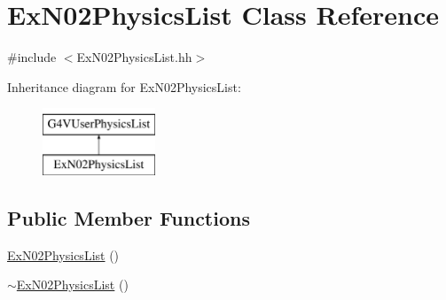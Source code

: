 \hypertarget{class_ex_n02_physics_list}{\section{Ex\-N02\-Physics\-List Class Reference}
\label{class_ex_n02_physics_list}
}


{\ttfamily \#include $<$Ex\-N02\-Physics\-List.\-hh$>$}

Inheritance diagram for Ex\-N02\-Physics\-List\-:\begin{figure}[H]
\begin{center}
\leavevmode
\includegraphics[height=2.000000cm]{class_ex_n02_physics_list}
\end{center}
\end{figure}
\subsection*{Public Member Functions}
\begin{DoxyCompactItemize}
\item 
\hyperlink{class_ex_n02_physics_list_a335ddba495822784e59d31c1c54abaf8}{Ex\-N02\-Physics\-List} ()
\item 
\hyperlink{class_ex_n02_physics_list_a5d4c806f9011ceccfca992447fa12745}{$\sim$\-Ex\-N02\-Physics\-List} ()
\end{DoxyCompactItemize}

